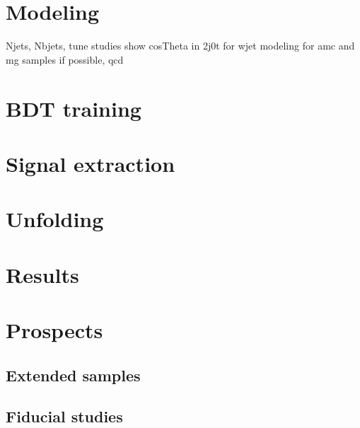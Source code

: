 \section{Modeling}
\label{sec:diff13-modeling}
Njets, Nbjets, tune studies
show cosTheta in 2j0t for wjet modeling for amc and mg samples if possible, qcd


\section{BDT training}
\label{sec:diff13-bdt}

\section{Signal extraction}
\label{sec:diff13-fit}


\section{Unfolding}

\section{Results}


\section{Prospects}

\subsection{Extended samples}

\subsection{Fiducial studies}
\label{sec:diff13-fiducial-studies}



